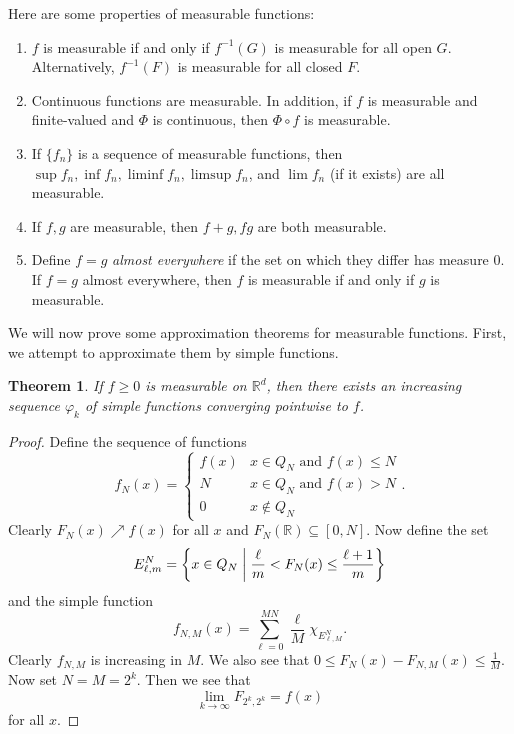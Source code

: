 \documentclass[leqno, openany]{memoir}
\newtheorem{thm}{Theorem}[chapter]
\theoremstyle{definition}
\theoremstyle{remark}
\theoremstyle{plain}
\theoremstyle{definition}
\theoremstyle{remark}
\newcommand{\R}{\mathbb{R}}
\begin{document}
Here are some properties of measurable functions:
\begin{enumerate}
    \item $f$ is measurable if and only if $f^{-1}(G)$ is measurable for all open $G$. Alternatively, $f^{-1}(F)$ is measurable for all closed $F$.
    \item Continuous functions are measurable. In addition, if $f$ is measurable and finite-valued and $\Phi$ is continuous, then $\Phi \circ f$ is measurable.
    \item If $\{f_n \}$ is a sequence of measurable functions, then $\sup f_n, \inf f_n, \liminf f_n, \limsup f_n$, and $\lim f_n$ (if it exists) are all measurable.
    \item If $f,g$ are measurable, then $f+g, fg$ are both measurable.
    \item Define $f=g$ \textit{almost everywhere} if the set on which they differ has measure $0$. If $f=g$ almost everywhere, then $f$ is measurable if and only if $g$ is measurable.
\end{enumerate}

We will now prove some approximation theorems for measurable functions. First, we attempt to approximate them by simple functions.

\begin{thm}
    If $f \geq 0$ is measurable on $\R^d$, then there exists an increasing sequence $\varphi_k$ of simple functions converging pointwise to $f$.
\end{thm}

\begin{proof}
    Define the sequence of functions
    \[ f_N(x) = \begin{cases}
        f(x) & x \in Q_N \text{ and } f(x) \leq N \\
        N & x \in Q_N \text{ and } f(x) > N \\
        0 & x \notin Q_N
    \end{cases}. \]
    Clearly $F_N(x) \nearrow f(x)$ for all $x$ and $F_N(\R) \subseteq [0,N]$. Now define the set
    \[ E_{\ell,m}^N = \qty{ x \in Q_N \mathrel{\bigg|} \frac{\ell}{m} < F_N(x) \leq \frac{\ell+1}{m} } \]
    and the simple function
    \[ f_{N,M}(x) = \sum_{\ell = 0}^{MN} \frac{\ell}{M} \chi_{E_{\ell,M}^N}. \]
    Clearly $f_{N,M}$ is increasing in $M$. We also see that $0 \leq F_N(x) - F_{N,M}(x) \leq \frac{1}{M}$. Now set $N = M = 2^k$. Then we see that 
    \[ \lim_{k \to \infty} F_{2^k,2^k} = f(x) \]
    for all $x$.
\end{proof}
\end{document}
